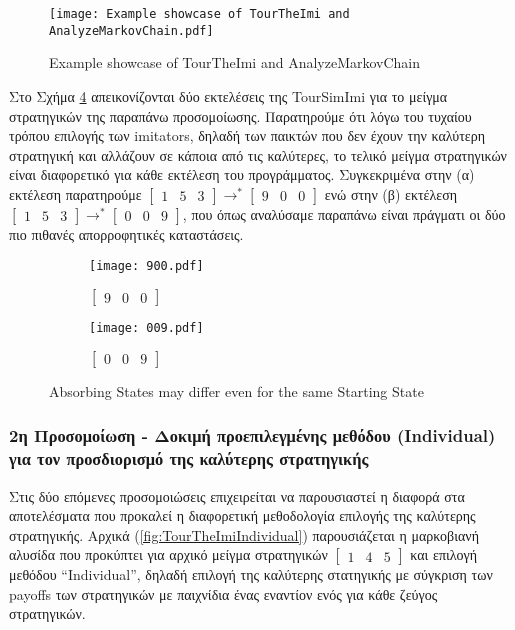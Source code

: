 	\begin{figure}[h]
	      \centering
	      \texttt{[image: Example showcase of TourTheImi and AnalyzeMarkovChain.pdf]}
	      \caption{Example showcase of TourTheImi and AnalyzeMarkovChain}
	      \label{fig:TourTheImi153}
	\end{figure}
	
Στο Σχήμα \ref{fig:TourSimImi153} απεικονίζονται δύο εκτελέσεις της TourSimImi για το μείγμα στρατηγικών της παραπάνω προσομοίωσης. Παρατηρούμε ότι λόγω του τυχαίου τρόπου επιλογής των imitators, δηλαδή των παικτών που δεν έχουν την καλύτερη στρατηγική και αλλάζουν σε κάποια από τις καλύτερες, το τελικό μείγμα στρατηγικών είναι διαφορετικό για κάθε εκτέλεση του προγράμματος. Συγκεκριμένα στην (α) εκτέλεση παρατηρούμε $\begin{bmatrix}1&5&3\end{bmatrix} \rightarrow^* \begin{bmatrix}9&0&0\end{bmatrix}$ ενώ στην (β) εκτέλεση $\begin{bmatrix}1&5&3\end{bmatrix} \rightarrow^*	\begin{bmatrix}0&0&9\end{bmatrix}$, που όπως αναλύσαμε παραπάνω είναι πράγματι οι δύο πιο πιθανές απορροφητικές καταστάσεις.
	\begin{figure}[h]
		\centering
		\begin{subfigure}{.5\textwidth}
			\centering
	      	\texttt{[image: 900.pdf]}
			\caption{$\begin{bmatrix}9&0&0\end{bmatrix}$}
	      	\label{fig:900}
		\end{subfigure}%
		\begin{subfigure}{.5\textwidth}
			\centering
	      	\texttt{[image: 009.pdf]}
			\caption{$\begin{bmatrix}0&0&9\end{bmatrix}$}
	      	\label{fig:009}
		\end{subfigure}
		\caption{Absorbing States may differ even for the same Starting State}
		\label{fig:TourSimImi153}
	\end{figure}

\subsubsection{2η Προσομοίωση - Δοκιμή προεπιλεγμένης μεθόδου (Individual) για τον προσδιορισμό της καλύτερης στρατηγικής}
Στις δύο επόμενες προσομοιώσεις επιχειρείται να παρουσιαστεί η διαφορά στα αποτελέσματα που προκαλεί η διαφορετική μεθοδολογία επιλογής της καλύτερης στρατηγικής. Αρχικά (\ref{fig:TourTheImiIndividual}) παρουσιάζεται η μαρκοβιανή αλυσίδα που προκύπτει για αρχικό μείγμα στρατηγικών $\begin{bmatrix}1&4&5\end{bmatrix}$ και επιλογή μεθόδου ``Individual'', δηλαδή επιλογή της καλύτερης στατηγικής με σύγκριση των payoffs των στρατηγικών με παιχνίδια ένας εναντίον ενός για κάθε ζεύγος στρατηγικών.

